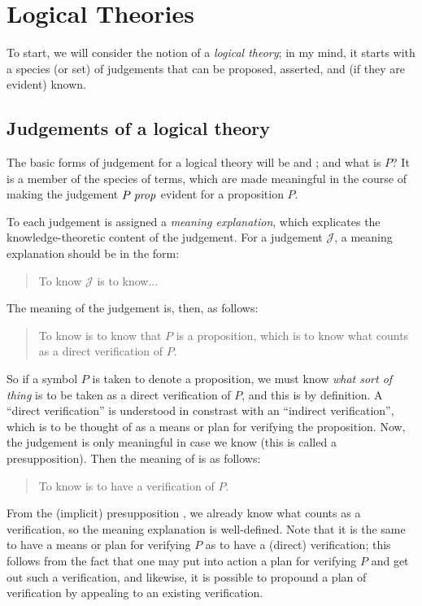 \documentclass[main.tex]{subfiles}
\begin{document}
\onehalfspacing

\chapter{Logical Theories}

To start, we will consider the notion of a \emph{logical theory}; in my mind,
it starts with a species (or set) of judgements that can be proposed, asserted,
and (if they are evident) known.

\section{Judgements of a logical theory}

The basic forms of judgement for a logical theory will be  and
; and what is $P$? It is a member of the species of terms,
which are made meaningful in the course of making the judgement
$P\;\mathit{prop}$ evident for a proposition $P$.

To each judgement is assigned a \emph{meaning explanation}, which explicates
the knowledge-theoretic content of the judgement. For a judgement
$\mathcal{J}$, a meaning explanation should be in the form:
\begin{quote}
  To know $\mathcal{J}$ is to know...
\end{quote}

The meaning of the judgement  is, then, as follows:
\begin{quote}
  To know  is to know that $P$ is a proposition, which is to know
  what counts as a direct verification of $P$.
\end{quote}

So if a symbol $P$ is taken to denote a proposition, we must know \emph{what
sort of thing} is to be taken as a direct verification of $P$, and this is by
definition. A ``direct verification'' is understood in constrast with an
``indirect verification'', which is to be thought of as a means or plan for
verifying the proposition. Now, the judgement  is only meaningful in
case we know  (this is called a presupposition). Then the meaning of
 is as follows:
\begin{quote}
  To know  is to have a verification of $P$.
\end{quote}

From the (implicit) presupposition , we already know what counts as a
verification, so the meaning explanation is well-defined. Note that it is the
same to have a means or plan for verifying $P$ as to have a (direct)
verification; this follows from the fact that one may put into action a plan
for verifying $P$ and get out such a verification, and likewise, it is possible
to propound a plan of verification by appealing to an existing verification.
\end{document}
